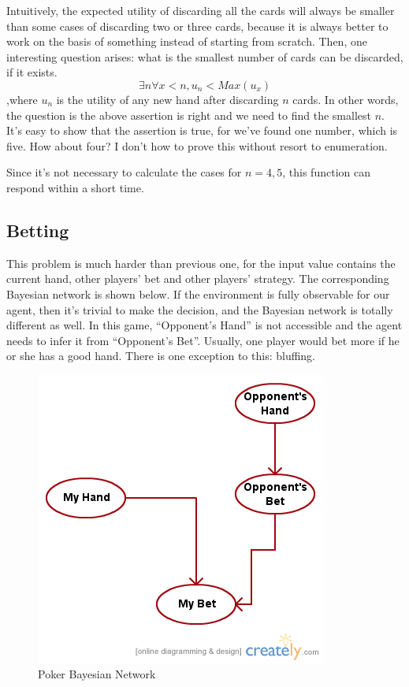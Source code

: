 \documentclass{report}
\begin{document}
Intuitively, the expected utility of discarding all the cards will always be smaller than some cases of discarding two or three cards, because it is 
always better to work on the basis of something instead of starting from scratch. Then, one interesting question arises: what is the smallest number 
of cards can be discarded, if it exists.
\[ \exists n \forall x<n, u_n < Max(u_x) \]
,where $u_n$ is the utility of any new hand after discarding $n$ cards. In other words, the question is the above assertion is right and we need to 
find the smallest $n$. It's easy to show that the assertion is true, for we've found one number, which is five. How about four? I don't how to prove 
this without resort to enumeration.

Since it's not necessary to calculate the cases for $n=4, 5$, this function can respond within a short time.
\subsection{Betting}
This problem is much harder than previous one, for the input value contains the current hand, other players' bet and other players' strategy. The 
corresponding Bayesian network is shown below. If the environment is fully observable for our agent, then it's trivial to make the decision, and the 
Bayesian network is totally different as well. In this game, ``Opponent's Hand'' is not accessible and the agent needs to infer it from ``Opponent's 
Bet''. Usually, one player would bet more if he or she has a good hand. There is one exception to this: bluffing.
\begin{figure}[t]
	\begin{center}
		\includegraphics[scale=0.5]{PokerBayesianNetwork.png}
		\caption{Poker Bayesian Network}
	\end{center}
\end{figure}
\end{document}

